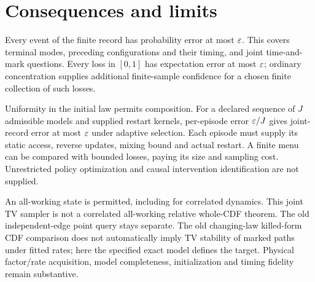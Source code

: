 \section{Consequences and limits}
Every event of the finite record has probability error at most $\varepsilon$. This covers terminal modes, preceding configurations and their timing, and joint time-and-mark questions. Every loss in $[0,1]$ has expectation error at most $\varepsilon$; ordinary concentration supplies additional finite-sample confidence for a chosen finite collection of such losses.

Uniformity in the initial law permits composition. For a declared sequence of $J$ admissible models and supplied restart kernels, per-episode error $\varepsilon/J$ gives joint-record error at most $\varepsilon$ under adaptive selection. Each episode must supply its static access, reverse updates, mixing bound and actual restart. A finite menu can be compared with bounded losses, paying its size and sampling cost. Unrestricted policy optimization and causal intervention identification are not supplied.

An all-working state is permitted, including for correlated dynamics. This joint TV sampler is not a correlated all-working relative whole-CDF theorem. The old independent-edge point query stays separate. The old changing-law killed-form CDF comparison does not automatically imply TV stability of marked paths under fitted rates; here the specified exact model defines the target. Physical factor/rate acquisition, model completeness, initialization and timing fidelity remain substantive.


